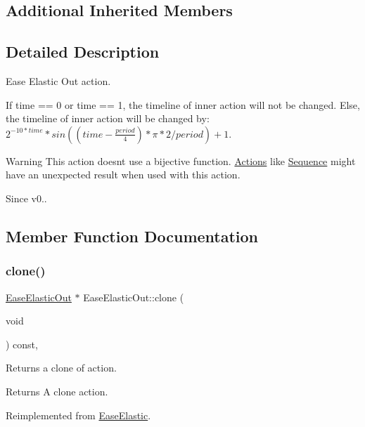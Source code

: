 \subsection*{Additional Inherited Members}


\subsection{Detailed Description}
Ease Elastic Out action. 

If time == 0 or time == 1, the timeline of inner action will not be changed. Else, the timeline of inner action will be changed by\+: ${ 2 }^{ -10*time }*sin((time-\frac { period }{ 4 } )*\pi *2/period)+1$. \begin{DoxyWarning}{Warning}
This action doesn\textquotesingle{}t use a bijective function. \hyperlink{classActions}{Actions} like \hyperlink{classSequence}{Sequence} might have an unexpected result when used with this action. 
\end{DoxyWarning}
\begin{DoxySince}{Since}
v0.. 
\end{DoxySince}


\subsection{Member Function Documentation}
\mbox{\label{classEaseElasticOut_a1f1e56422100f620e725ec11c595e1f2}} 
\subsubsection{\texorpdfstring{clone()}{clone()}}
{\footnotesize\ttfamily \hyperlink{classEaseElasticOut}{Ease\+Elastic\+Out} $\ast$ Ease\+Elastic\+Out\+::clone (\begin{DoxyParamCaption}\item[{void}]{ }\end{DoxyParamCaption}) const\hspace{0.3cm}{\ttfamily [override]}, {\ttfamily [virtual]}}

Returns a clone of action.

\begin{DoxyReturn}{Returns}
A clone action. 
\end{DoxyReturn}


Reimplemented from \hyperlink{classEaseElastic_a72d5dc8a380dbb00e68c1d7c80258d28}{Ease\+Elastic}.


